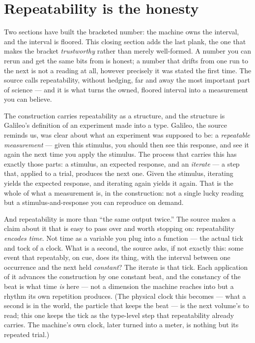 \section{Repeatability is the honesty}

Two sections have built the bracketed number: the machine owns the interval, and the interval is floored. This closing
section adds the last plank, the one that makes the bracket \emph{trustworthy} rather than merely well-formed. A number
you can rerun and get the same bits from is honest; a number that drifts from one run to the next is not a reading at
all, however precisely it was stated the first time. The source calls repeatability, without hedging, far and away the
most important part of science --- and it is what turns the owned, floored interval into a measurement you can believe.

The construction carries repeatability as a structure, and the structure is Galileo's definition of an experiment made
into a type. Galileo, the source reminds us, was clear about what an experiment was supposed to be: a \emph{repeatable
measurement} --- given this stimulus, you should then see this response, and see it again the next time you apply the
stimulus. The process that carries this has exactly those parts: a stimulus, an expected response, and an
\emph{iterate} --- a step that, applied to a trial, produces the next one. Given the stimulus, iterating yields the
expected response, and iterating again yields it again. That is the whole of what a measurement is, in the
construction: not a single lucky reading but a stimulus-and-response you can reproduce on demand.

And repeatability is more than ``the same output twice.'' The source makes a claim about it that is easy to pass over
and worth stopping on: repeatability \emph{encodes time}. Not time as a variable you plug into a function --- the
actual tick and tock of a clock. What is a second, the source asks, if not exactly this: some event that repeatably, on
cue, does its thing, with the interval between one occurrence and the next held \emph{constant}? The iterate is that
tick. Each application of it advances the construction by one constant beat, and the constancy of the beat is what time
\emph{is} here --- not a dimension the machine reaches into but a rhythm its own repetition produces. (The physical
clock this becomes --- what a second is in the world, the particle that keeps the beat --- is the next volume's to
read; this one keeps the tick as the type-level step that repeatability already carries. The machine's own clock,
later turned into a meter, is nothing but its repeated trial.)

